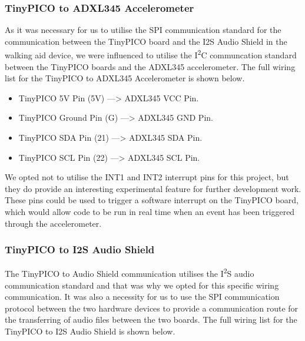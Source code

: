 			\subsubsection{TinyPICO to ADXL345 Accelerometer}

				As it was necessary for us to utilise the SPI communication standard for the communication between the TinyPICO board and the I2S Audio Shield in the walking aid device, we were influenced to utilise the I\textsuperscript{2}C communcation standard between the TinyPICO boards and the ADXL345 accelerometer. The full wiring list for the TinyPICO to ADXL345 Accelerometer is shown below.

				\begin{itemize}
					\item TinyPICO 5V Pin (5V) \hspace{2.5em} ---> \hspace{2em} ADXL345 VCC Pin.
					\item TinyPICO Ground Pin (G) \hspace{1.15em} ---> \hspace{2em} ADXL345 GND Pin.
					\item TinyPICO SDA Pin (21)	\hspace{2em} ---> \hspace{2em} ADXL345 SDA Pin.
					\item TinyPICO SCL Pin (22)	\hspace{2.1em} ---> \hspace{2em} ADXL345 SCL Pin.
				\end{itemize}

				We opted not to utilise the INT1 and INT2 interrupt pins for this project, but they do provide an interesting experimental feature for further development work. These pins could be used to trigger a software interrupt on the TinyPICO board, which would allow code to be run in real time when an event has been triggered through the accelerometer.

			\subsubsection{TinyPICO to I2S Audio Shield}

				The TinyPICO to Audio Shield communication utilises the I\textsuperscript{2}S audio communication standard and that was why we opted for this specific wiring communication. It was also a necessity for us to use the SPI communication protocol between the two hardware devices to provide a communication route for the transferring of audio files between the two boards. The full wiring list for the TinyPICO to I2S Audio Shield is shown below.


